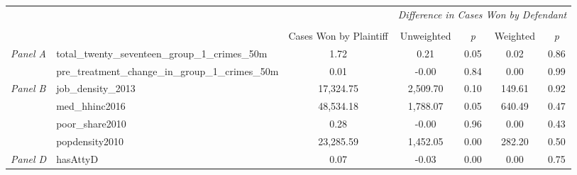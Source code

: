 \begin{tabular}{llccccc}
\toprule
 &  & \textit{} & \multicolumn{4}{c}{\textit{Difference in Cases Won by Defendant}} \\
\cline{4-7}
\\
 &  & Cases Won by Plaintiff & Unweighted & \emph{p} & Weighted & \emph{p} \\
\midrule
\multirow[c]{2}{3cm}{\textit{Panel A}} & total_twenty_seventeen_group_1_crimes_50m & 1.72 & 0.21 & 0.05 & 0.02 & 0.86 \\
 & pre_treatment_change_in_group_1_crimes_50m & 0.01 & -0.00 & 0.84 & 0.00 & 0.99 \\
\cline{1-7}
\multirow[c]{4}{3cm}{\textit{Panel B}} & job_density_2013 & 17,324.75 & 2,509.70 & 0.10 & 149.61 & 0.92 \\
 & med_hhinc2016 & 48,534.18 & 1,788.07 & 0.05 & 640.49 & 0.47 \\
 & poor_share2010 & 0.28 & -0.00 & 0.96 & 0.00 & 0.43 \\
 & popdensity2010 & 23,285.59 & 1,452.05 & 0.00 & 282.20 & 0.50 \\
\cline{1-7}
\textit{Panel D} & hasAttyD & 0.07 & -0.03 & 0.00 & 0.00 & 0.75 \\
\cline{1-7}
\bottomrule
\end{tabular}
